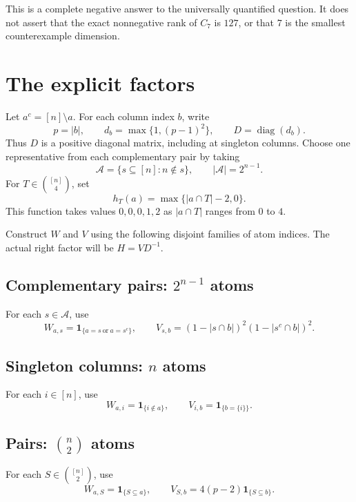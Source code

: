 \documentclass[11pt]{article}
\newcommand{\ind}[1]{\mathbf 1_{\{#1\}}}
\newcommand{\Aset}{\mathcal A}
\begin{document}
This is a complete negative answer to the universally quantified question. It does not assert that the exact nonnegative rank of $C_7$ is $127$, or that $7$ is the smallest counterexample dimension.

\section{The explicit factors}\label{sec:factors}

Let $a^c=[n]\setminus a$. For each column index $b$, write
\begin{equation}\label{eq:denom}
p=|b|,\qquad d_b=\max\{1,(p-1)^2\},\qquad D=\operatorname{diag}(d_b).
\end{equation}
Thus $D$ is a positive diagonal matrix, including at singleton columns. Choose one representative from each complementary pair by taking
\[
\Aset=\{s\subseteq[n]:n\notin s\},\qquad |\Aset|=2^{n-1}.
\]
For $T\in\binom{[n]}4$, set
\begin{equation}\label{eq:h}
h_T(a)=\max\{|a\cap T|-2,0\}.
\end{equation}
This function takes values $0,0,0,1,2$ as $|a\cap T|$ ranges from $0$ to $4$.

Construct $W$ and $V$ using the following disjoint families of atom indices. The actual right factor will be $H=VD^{-1}$.

\subsection*{Complementary pairs: $2^{n-1}$ atoms}
For each $s\in\Aset$, use
\begin{equation}\label{eq:core}
W_{a,s}=\ind{a=s\ \text{or}\ a=s^c},\qquad
V_{s,b}=(1-|s\cap b|)^2(1-|s^c\cap b|)^2.
\end{equation}

\subsection*{Singleton columns: $n$ atoms}
For each $i\in[n]$, use
\begin{equation}\label{eq:single}
W_{a,i}=\ind{i\notin a},\qquad V_{i,b}=\ind{b=\{i\}}.
\end{equation}

\subsection*{Pairs: $\binom n2$ atoms}
For each $S\in\binom{[n]}2$, use
\begin{equation}\label{eq:pair}
W_{a,S}=\ind{S\subseteq a},\qquad V_{S,b}=4(p-2)\ind{S\subseteq b}.
\end{equation}
\end{document}
